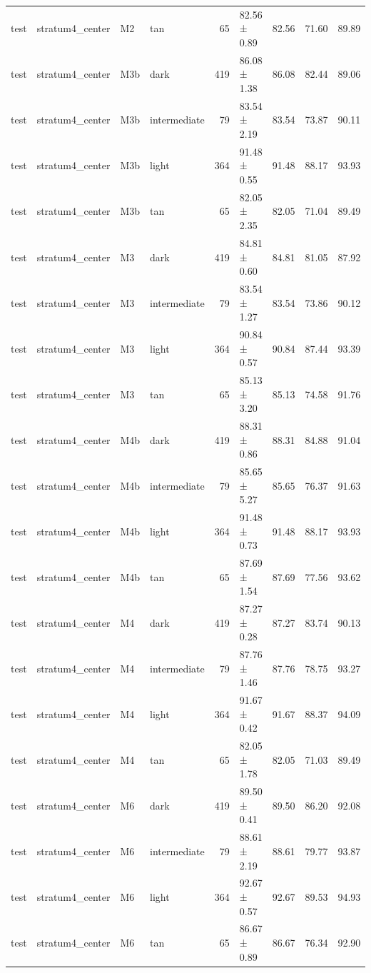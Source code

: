 \begin{tabular}{llllrlrrr}
test & stratum4\_center & M2 & tan & 65 & 82.56 ± 0.89 & 82.56 & 71.60 & 89.89 \\
test & stratum4\_center & M3b & dark & 419 & 86.08 ± 1.38 & 86.08 & 82.44 & 89.06 \\
test & stratum4\_center & M3b & intermediate & 79 & 83.54 ± 2.19 & 83.54 & 73.87 & 90.11 \\
test & stratum4\_center & M3b & light & 364 & 91.48 ± 0.55 & 91.48 & 88.17 & 93.93 \\
test & stratum4\_center & M3b & tan & 65 & 82.05 ± 2.35 & 82.05 & 71.04 & 89.49 \\
test & stratum4\_center & M3 & dark & 419 & 84.81 ± 0.60 & 84.81 & 81.05 & 87.92 \\
test & stratum4\_center & M3 & intermediate & 79 & 83.54 ± 1.27 & 83.54 & 73.86 & 90.12 \\
test & stratum4\_center & M3 & light & 364 & 90.84 ± 0.57 & 90.84 & 87.44 & 93.39 \\
test & stratum4\_center & M3 & tan & 65 & 85.13 ± 3.20 & 85.13 & 74.58 & 91.76 \\
test & stratum4\_center & M4b & dark & 419 & 88.31 ± 0.86 & 88.31 & 84.88 & 91.04 \\
test & stratum4\_center & M4b & intermediate & 79 & 85.65 ± 5.27 & 85.65 & 76.37 & 91.63 \\
test & stratum4\_center & M4b & light & 364 & 91.48 ± 0.73 & 91.48 & 88.17 & 93.93 \\
test & stratum4\_center & M4b & tan & 65 & 87.69 ± 1.54 & 87.69 & 77.56 & 93.62 \\
test & stratum4\_center & M4 & dark & 419 & 87.27 ± 0.28 & 87.27 & 83.74 & 90.13 \\
test & stratum4\_center & M4 & intermediate & 79 & 87.76 ± 1.46 & 87.76 & 78.75 & 93.27 \\
test & stratum4\_center & M4 & light & 364 & 91.67 ± 0.42 & 91.67 & 88.37 & 94.09 \\
test & stratum4\_center & M4 & tan & 65 & 82.05 ± 1.78 & 82.05 & 71.03 & 89.49 \\
test & stratum4\_center & M6 & dark & 419 & 89.50 ± 0.41 & 89.50 & 86.20 & 92.08 \\
test & stratum4\_center & M6 & intermediate & 79 & 88.61 ± 2.19 & 88.61 & 79.77 & 93.87 \\
test & stratum4\_center & M6 & light & 364 & 92.67 ± 0.57 & 92.67 & 89.53 & 94.93 \\
test & stratum4\_center & M6 & tan & 65 & 86.67 ± 0.89 & 86.67 & 76.34 & 92.90 \\

\end{tabular}
